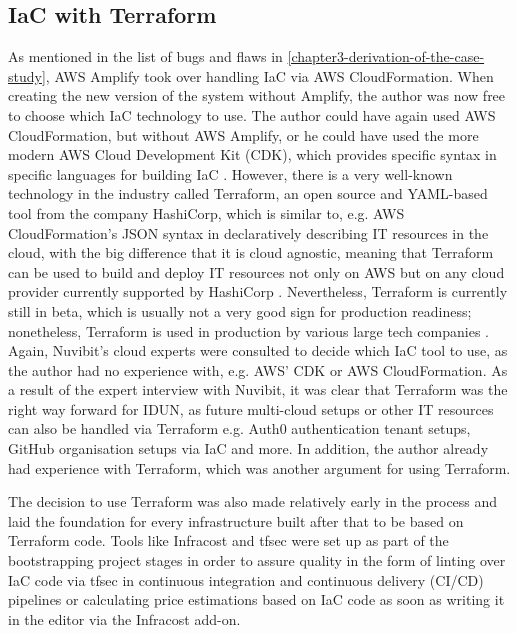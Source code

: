 \subsection{IaC with Terraform}
\label{chapter4-iac-with-terraform}

As mentioned in the list of bugs and flaws in \autoref{chapter3-derivation-of-the-case-study}, AWS Amplify took over handling IaC via AWS CloudFormation. When creating the new version of the system without Amplify, the author was now free to choose which IaC technology to use. The author could have again used AWS CloudFormation, but without AWS Amplify, or he could have used the more modern AWS Cloud Development Kit (CDK), which provides specific syntax in specific languages for building IaC \citep{amazon_web_services_inc_aws_nodate}. However, there is a very well-known technology in the industry called Terraform, an open source and YAML-based tool from the company HashiCorp, which is similar to, e.g. AWS CloudFormation's JSON syntax in declaratively describing IT resources in the cloud, with the big difference that it is cloud agnostic, meaning that Terraform can be used to build and deploy IT resources not only on AWS but on any cloud provider currently supported by HashiCorp \citep{hashicorp_browse_nodate}. Nevertheless, Terraform is currently still in beta, which is usually not a very good sign for production readiness; nonetheless, Terraform is used in production by various large tech companies \citep{stackshare_why_nodate}. Again, Nuvibit's cloud experts were consulted to decide which IaC tool to use, as the author had no experience with, e.g. AWS' CDK or AWS CloudFormation. As a result of the expert interview with Nuvibit, it was clear that Terraform was the right way forward for IDUN, as future multi-cloud setups or other IT resources can also be handled via Terraform e.g. Auth0 authentication tenant setups, GitHub organisation setups via IaC and more. In addition, the author already had experience with Terraform, which was another argument for using Terraform.

The decision to use Terraform was also made relatively early in the process and laid the foundation for every infrastructure built after that to be based on Terraform code. Tools like Infracost and tfsec were set up as part of the bootstrapping project stages in order to assure quality in the form of linting over IaC code via tfsec in continuous integration and continuous delivery (CI/CD) pipelines or calculating price estimations based on IaC code as soon as writing it in the editor via the Infracost add-on.

